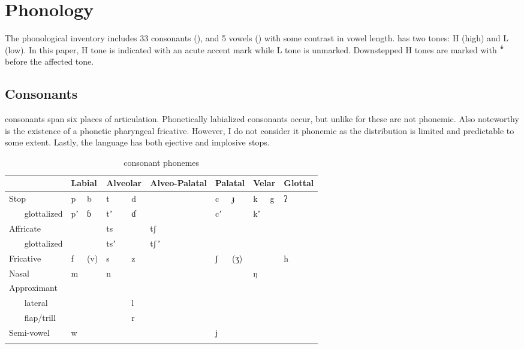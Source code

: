 \documentclass[output=paper]{langsci/langscibook}
\begin{document}
\section{Phonology}\label{sec:ahlandc:3}


The  phonological inventory includes 33 consonants (), and 5 vowels () with some contrast in vowel length.  has two tones: H (high) and L (low). In this paper, H tone is indicated with an acute accent mark while L tone is unmarked. Downstepped H tones are marked with \textsf{ꜜ }before the affected tone.


\subsection{Consonants}\label{sec:ahlandc:3.1}

 consonants span six places of articulation. Phonetically labialized consonants occur, but unlike for  these are not phonemic. Also noteworthy is the existence of a phonetic pharyngeal fricative. However, I do not consider it phonemic as the distribution is limited and predictable to some extent. Lastly, the language has both ejective and implosive stops.  

\begin{table}
\begin{tabularx}{\textwidth}{lXXXXXXXXXXXX} \lsptoprule & \multicolumn{2}{X}{Labial} & \multicolumn{2}{X}{Alveolar} & \multicolumn{2}{X}{Alveo-Palatal} & \multicolumn{2}{X}{Palatal} & \multicolumn{2}{X}{Velar} & \multicolumn{2}{X}{Glottal} \\
\midrule
Stop & p   &     b & t    &      d &  &  & c     &    ɟ & k    &    g & ʔ& \\
{\ \ \ } glottalized & pʼ    &   ɓ & tʼ     &    ɗ & &  & cʼ & & kʼ & & & \\
Affricate & & & ts & & tʃ & & &  &  & & & \\
{\ \ \ } glottalized & & & tsʼ & & tʃ\,ʼ & & & & & & & \\
Fricative & f    &    (v) & s     &     z &  & & ʃ    &     (ʒ) & &  & h & \\
Nasal & m & & n & & &  & &  & ŋ & & & \\
Approximant & & & & & & & & & & & & \\
{\ \ \ } lateral & &  & & l & &  & &  & &  & & \\
{\ \ \ } flap/trill & &  & & r & & & & & & & & \\
Semi-vowel & w & & &  &  & & j & & &  & & \\
\lspbottomrule
\end{tabularx}
\caption{ consonant phonemes}
\label{tab:ahlandc:1}
\end{table}
\end{document}
